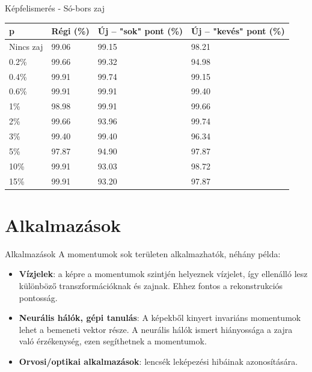 \documentclass{beamer}
\begin{document}
\begin{frame}{Képfelismerés - Só-bors zaj}
    \vskip 1cm
    \begin{table}[tbp]
        \centering
        \begin{tabular}{|p{1.5cm}|p{1.5cm}|p{1.8cm}|p{2cm}|} \hline
            p & \textbf{Régi} (\%) & \textbf{Új} -- "sok" pont (\%)& \textbf{Új} -- "kevés" pont (\%) \\ \hline\hline
            Nincs zaj & 99.06 & 99.15 & 98.21 \\ \hline
            0.2\% & 99.66 & 99.32 & 94.98 \\ \hline
            0.4\% & 99.91 & 99.74 & 99.15 \\ \hline
            0.6\% & 99.91 & 99.91 & 99.40 \\ \hline
            1\% & 98.98 & 99.91 & 99.66 \\ \hline
            2\% & 99.66 & 93.96 & 99.74 \\ \hline
            3\% & 99.40 & 99.40 & 96.34 \\ \hline
            5\% & 97.87 & 94.90 & 97.87 \\ \hline
            10\% & 99.91 & 93.03 & 98.72 \\ \hline
            15\% & 99.91 & 93.20 & 97.87 \\ \hline
        \end{tabular}
    \end{table}
\end{frame}

\section{Alkalmazások}
\begin{frame}{Alkalmazások}
    A momentumok sok területen alkalmazhatók, néhány példa:
    \begin{itemize}
    \item \textbf{Vízjelek}: a képre a momentumok szintjén helyeznek vízjelet, így ellenálló lesz különböző transzformációknak és zajnak. Ehhez fontos a rekonstrukciós pontosság.
    \item \textbf{Neurális hálók, gépi tanulás}: A képekből kinyert invariáns momentumok lehet a bemeneti vektor része. A neurális hálók ismert hiányossága a zajra való érzékenység, ezen segíthetnek a momentumok.
    \item \textbf{Orvosi/optikai alkalmazások}: lencsék leképezési hibáinak azonosítására.
    \end{itemize}
\end{frame}
\end{document}
